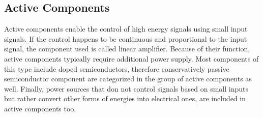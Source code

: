 




\subsection{Active Components}
Active components enable the control of high energy signals using small input signals. If the control happens to be continuous and proportional to the input signal, the component used is called linear amplifier. Because of their function, active components typically require additional power supply. Most components of this type include doped semiconductors, therefore conservatively passive semiconductor component are categorized in the group of active components as well. Finally, power sources that don not control signals based on small inputs but rather convert other forms of energies into electrical ones, are included in active components too.

